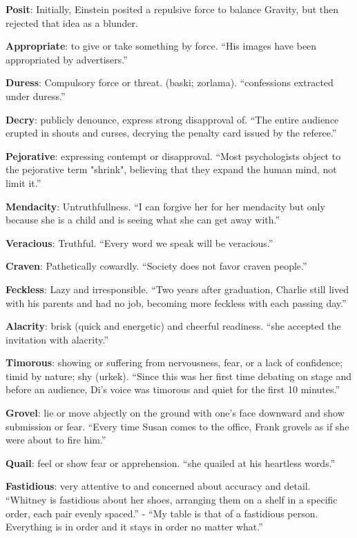 \documentclass[12pt, a4paper]{ximera}
\begin{document}
\textbf{Posit}: Initially, Einstein posited a repulsive force to balance Gravity, but then rejected that idea as a blunder.

\textbf{Appropriate}: to give or take something by force. ``His images have been appropriated by advertisers.''

\textbf{Duress}: Compulsory force or threat. (baski; zorlama). ``confessions extracted under duress.''

\textbf{Decry}: publicly denounce, express strong disapproval of. ``The entire audience erupted in shouts and curses, decrying the penalty card issued by the referee.''

\textbf{Pejorative}: expressing contempt or disapproval. ``Most psychologists object to the pejorative term "shrink", believing that they expand the human mind, not limit it.''
 
\textbf{Mendacity}: Untruthfullness. ``I can forgive her for her mendacity but only because she is a child and is seeing what she can get away with.''

\textbf{Veracious}: Truthful. ``Every word we speak will be veracious.''

\textbf{Craven}: Pathetically cowardly. ``Society does not favor craven people.''

\textbf{Feckless}: Lazy and irresponsible. ``Two years after graduation, Charlie still lived with his parents and had no job, becoming more feckless with each passing day.''

\textbf{Alacrity}: brisk (quick and energetic) and cheerful readiness. ``she accepted the invitation with alacrity.''

\textbf{Timorous}: showing or suffering from nervousness, fear, or a lack of confidence; timid by nature; shy (urkek). ``Since this was her first time debating on stage and before an audience, Di's voice was timorous and quiet for the first 10 minutes.''

\textbf{Grovel}: lie or move abjectly on the ground with one's face downward and show submission or fear. ``Every time Susan comes to the office, Frank grovels as if she were about to fire him.''

\textbf{Quail}: feel or show fear or apprehension. ``she quailed at his heartless words.''

\textbf{Fastidious}: very attentive to and concerned about accuracy and detail. ``Whitney is fastidious about her shoes, arranging them on a shelf in a specific order, each pair evenly spaced.'' - ``My table is that of a fastidious person. Everything is in order and it stays in order no matter what.''
\end{document}
